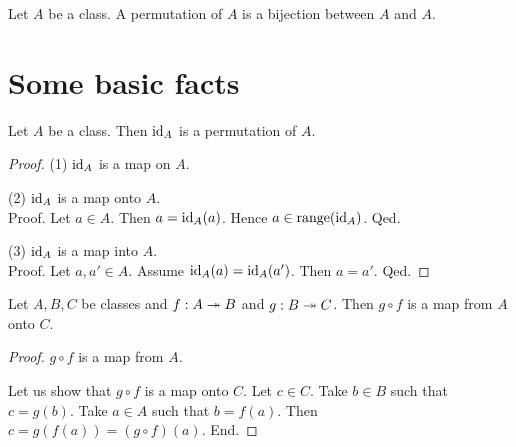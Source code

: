 \documentclass[../set-theory.tex]{subfiles}
\begin{document}
  \begin{forthel}
    \begin{definition}\label{SET_THEORY_08_8188451318923264}
      Let $A$ be a class.
      A permutation of $A$ is a bijection between $A$ and $A$.
    \end{definition}
  \end{forthel}


  \section{Some basic facts}

  \begin{forthel}
    \begin{proposition}\label{SET_THEORY_08_7883784041005056}
      Let $A$ be a class.
      Then $\operatorname{id}_{A}$ is a permutation of $A$.
    \end{proposition}
    \begin{proof}
      (1) $\operatorname{id}_{A}$ is a map on $A$.

      (2) $\operatorname{id}_{A}$ is a map onto $A$. \\
      Proof.
        Let $a \in A$.
        Then $a = \operatorname{id}_{A}(a)$.
        Hence $a \in \operatorname{range}(\operatorname{id}_{A})$.
      Qed.

      (3) $\operatorname{id}_{A}$ is a map into $A$. \\
      Proof.
        Let $a, a' \in A$.
        Assume $\operatorname{id}_{A}(a) = \operatorname{id}_{A}(a')$.
        Then $a = a'$.
      Qed.
    \end{proof}
  \end{forthel}

  \begin{forthel}
    \begin{proposition}\label{SET_THEORY_08_8542698338254848}
      Let $A, B, C$ be classes and $f : A \twoheadrightarrow B$ and $g : B \twoheadrightarrow C$.
      Then $g \circ f$ is a map from $A$ onto $C$.
    \end{proposition}
    \begin{proof}
      $g \circ f$ is a map from $A$.

      Let us show that $g \circ f$ is a map onto $C$.
        Let $c \in C$.
        Take $b \in B$ such that $c = g(b)$.
        Take $a \in A$ such that $b = f(a)$.
        Then $c = g(f(a)) = (g \circ f)(a)$.
      End.
    \end{proof}
  \end{forthel}
\end{document}
